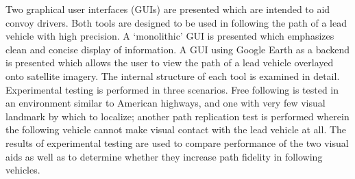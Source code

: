 Two graphical user interfaces (GUIs) are presented which are intended to aid convoy drivers.
Both tools are designed to be used in following the path of a lead vehicle with high precision.
A `monolithic' GUI is presented which emphasizes clean and concise display of information.
A GUI using Google Earth as a backend is presented which allows the user to view the path of a lead vehicle overlayed onto satellite imagery.
The internal structure of each tool is examined in detail.
Experimental testing is performed in three scenarios.
Free following is tested in an environment similar to American highways, and one with very few visual landmark by which to localize; another path replication test is performed wherein the following vehicle cannot make visual contact with the lead vehicle at all.
The results of experimental testing are used to compare performance of the two visual aids as well as to determine whether they increase path fidelity in following vehicles.

